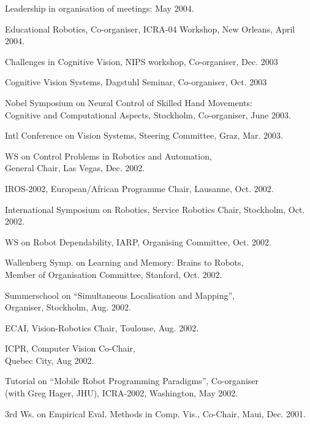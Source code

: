 \documentclass{article}
\begin{document}
\begin{cv}
\begin{cvlist}{Leadership in organisation of meetings:}
  \cftdotfill{\cftdotsep} May 2004.
\item Educational Robotics, Co-organiser, ICRA-04 Workshop, New
  Orleans, \cftdotfill{\cftdotsep} April 2004.
\item Challenges in Cognitive Vision, NIPS workshop, Co-organiser,
  \cftdotfill{\cftdotsep} Dec. 2003
\item Cognitive Vision Systems, Dagstuhl Seminar, Co-organiser,
  \cftdotfill{\cftdotsep} Oct. 2003
\item Nobel Symposium on Neural Control of Skilled Hand
  Movements:\\ Cognitive and Computational Aspects, Stockholm,
  Co-organiser, \cftdotfill{\cftdotsep} June 2003.
\item Intl Conference on Vision Systems, Steering Committee, Graz,
  \cftdotfill{\cftdotsep} Mar. 2003.
\item WS on Control Problems in Robotics and Automation, \\General
  Chair, Las Vegas, \cftdotfill{\cftdotsep}Dec. 2002.
\item IROS-2002, European/African Programme Chair, Lausanne,
  \cftdotfill{\cftdotsep} Oct. 2002.
\item International Symposium on Robotics, Service Robotics Chair,
  Stockholm, \cftdotfill{\cftdotsep} Oct. 2002.
\item WS on Robot Dependability, IARP, Organising Committee,
  \cftdotfill{\cftdotsep} Oct. 2002.
\item Wallenberg Symp. on Learning and Memory: Brains to Robots,\\
  Member of Organisation Committee, Stanford, \cftdotfill{\cftdotsep} Oct. 2002.
\item Summerschool on ``Simultaneous Localisation and Mapping'',
  \\Organiser, Stockholm, \cftdotfill{\cftdotsep}Aug. 2002.
\item ECAI, Vision-Robotics Chair, Toulouse, \cftdotfill{\cftdotsep}
  Aug. 2002.
\item ICPR, Computer Vision Co-Chair,\\ Quebec City,
  \cftdotfill{\cftdotsep} Aug 2002.
\item Tutorial on ``Mobile Robot Programming Paradigms'',
  Co-organiser\\ (with Greg Hager, JHU), ICRA-2002, Washington,
  \cftdotfill{\cftdotsep}May 2002.
\item 3rd Ws. on Empirical Eval. Methods in Comp. Vis., Co-Chair,
  Maui, \cftdotfill{\cftdotsep} Dec. 2001.

\end{cvlist}
\end{cv}
\end{document}
